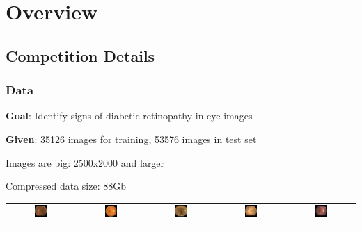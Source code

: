 \section{Overview} 

\subsection{Competition Details}
\begin{frame}\frametitle{Data} 
\par \textbf{Goal}: Identify signs of diabetic retinopathy in eye images
\par \textbf{Given}: 35126 images for training, 53576 images in test set
\par Images are big: 2500x2000 and larger
\par Compressed data size: 88Gb

\vspace{5pt}

\begin{tabular}{|@{}c@{}|@{}c@{}|@{}c@{}|@{}c@{}|@{}c@{}|}
\hline
	\includegraphics[width=0.2\textwidth]{pics/classified_samples/197_left_0.jpg} &
	\includegraphics[width=0.2\textwidth]{pics/classified_samples/204_right_1.jpg} &
	\includegraphics[width=0.2\textwidth]{pics/classified_samples/82_right_2.jpg} &
	\includegraphics[width=0.2\textwidth]{pics/classified_samples/687_right_3.jpg} &
	\includegraphics[width=0.2\textwidth]{pics/classified_samples/2496_left_4.jpg} \\\noalign{\vspace{-0.15cm}}
\hline


\end{tabular}
\end{frame}
